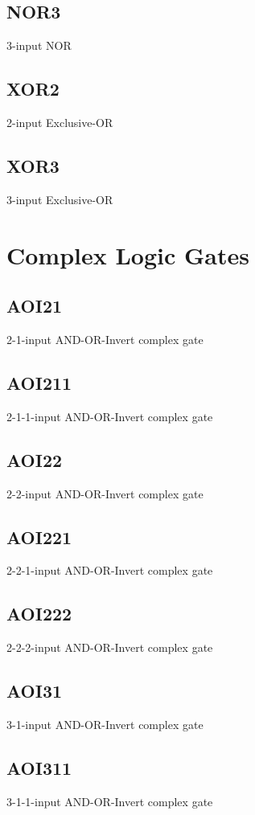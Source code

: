 \documentclass[12pt, a4paper, twoside, titlepage]{article}
\begin{document}
\subsection{NOR3}
3-input NOR

\subsection{XOR2}
2-input Exclusive-OR

\subsection{XOR3}
3-input Exclusive-OR


\section{Complex Logic Gates}

\subsection{AOI21}
2-1-input AND-OR-Invert complex gate

\subsection{AOI211}
2-1-1-input AND-OR-Invert complex gate

\subsection{AOI22}
2-2-input AND-OR-Invert complex gate

\subsection{AOI221}
2-2-1-input AND-OR-Invert complex gate

\subsection{AOI222}
2-2-2-input AND-OR-Invert complex gate

\subsection{AOI31}
3-1-input AND-OR-Invert complex gate

\subsection{AOI311}
3-1-1-input AND-OR-Invert complex gate
\end{document}

